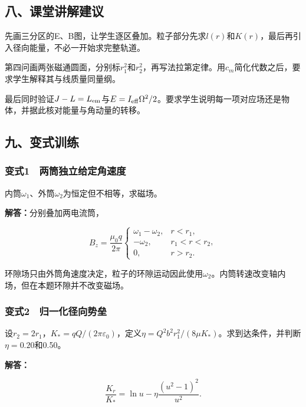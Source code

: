 \documentclass[12pt,a4paper,fontset=fandol]{ctexart}
\begin{document}
\subsection{八、课堂讲解建议}\label{ux516bux8bfeux5802ux8bb2ux89e3ux5efaux8bae-5}

先画三分区的E、B图，让学生逐区叠加。粒子部分先求\(l(r)\)和\(K(r)\)，最后再引入径向能量，不必一开始求完整轨道。

第四问画两张磁通圆面，分别标\(r_1^2\)和\(r_2^2\)，再写法拉第定律。用\(c_m\)简化代数之后，要求学生解释其与线质量同量纲。

最后同时验证\(J-L=L_{\rm em}\)与\(E=I_{\rm eff}\Omega^2/2\)。要求学生说明每一项对应场还是物体，并据此核对能量与角动量的转移。

\subsection{九、变式训练}\label{ux4e5dux53d8ux5f0fux8badux7ec3-5}

\subsubsection{变式1　两筒独立给定角速度}\label{ux53d8ux5f0f1-ux4e24ux7b52ux72ecux7acbux7ed9ux5b9aux89d2ux901fux5ea6}

内筒\(\omega_1\)、外筒\(\omega_2\)为恒定但不相等，求磁场。

\textbf{解答：}分别叠加两电流筒，

\[
B_z=\frac{\mu_0q}{2\pi}
\begin{cases}
\omega_1-\omega_2,&r<r_1,\\
-\omega_2,&r_1<r<r_2,\\
0,&r>r_2.
\end{cases}
\]

环隙场只由外筒角速度决定，粒子的环隙运动因此使用\(\omega_2\)。内筒转速改变轴内场，但在本题环隙并不改变磁场。

\subsubsection{变式2　归一化径向势垒}\label{ux53d8ux5f0f2-ux5f52ux4e00ux5316ux5f84ux5411ux52bfux5792}

设\(r_2=2r_1\)，\(K_*=qQ/(2\pi\varepsilon_0)\)，定义\(\eta=Q^2b^2r_1^2/(8\mu K_*)\)。求到达条件，并判断\(\eta=0.20\)和0.50。

\textbf{解答：}

\[
\frac{K_r}{K_*}=\ln u-\eta\frac{(u^2-1)^2}{u^2}.
\]
\end{document}
